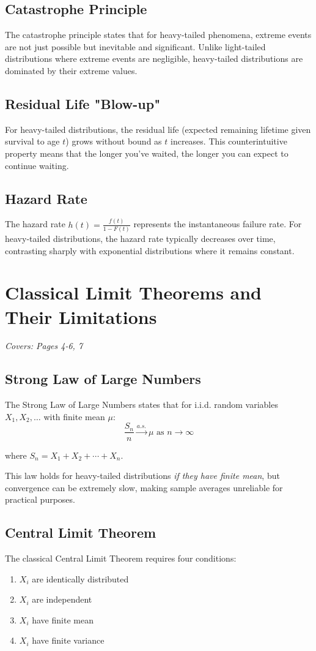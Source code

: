 \documentclass[11pt]{article}
\begin{document}
\subsection{Catastrophe Principle}
The catastrophe principle states that for heavy-tailed phenomena, extreme events are not just possible but inevitable and significant. Unlike light-tailed distributions where extreme events are negligible, heavy-tailed distributions are dominated by their extreme values.

\subsection{Residual Life "Blow-up"}
For heavy-tailed distributions, the residual life (expected remaining lifetime given survival to age $t$) grows without bound as $t$ increases. This counterintuitive property means that the longer you've waited, the longer you can expect to continue waiting.

\subsection{Hazard Rate}
The hazard rate $h(t) = \frac{f(t)}{1-F(t)}$ represents the instantaneous failure rate. For heavy-tailed distributions, the hazard rate typically decreases over time, contrasting sharply with exponential distributions where it remains constant.

\section{Classical Limit Theorems and Their Limitations}
\textit{Covers: Pages 4-6, 7}

\subsection{Strong Law of Large Numbers}
The Strong Law of Large Numbers states that for i.i.d. random variables $X_1, X_2, \ldots$ with finite mean $\mu$:
$$\frac{S_n}{n} \xrightarrow{a.s.} \mu \text{ as } n \to \infty$$

where $S_n = X_1 + X_2 + \cdots + X_n$.

This law holds for heavy-tailed distributions \textit{if they have finite mean}, but convergence can be extremely slow, making sample averages unreliable for practical purposes.

\subsection{Central Limit Theorem}
The classical Central Limit Theorem requires four conditions:
\begin{enumerate}
    \item $X_i$ are identically distributed
    \item $X_i$ are independent  
    \item $X_i$ have finite mean
    \item $X_i$ have finite variance
\end{enumerate}
\end{document}
